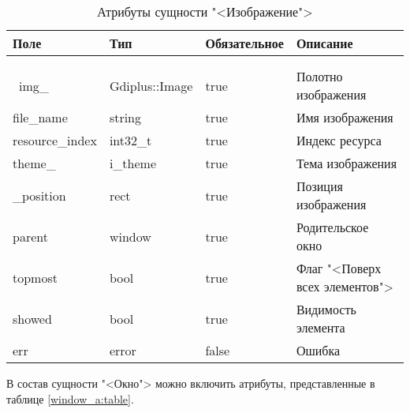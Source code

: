 \begin{xltabular}{\textwidth}{|l|l|p{1.7cm}|X|}
	\caption{Атрибуты сущности "<Изображение">\label{img_a:table}}\\ \hline
	\centrow Поле & \centrow Тип & \centrow Обяза\-тельное & \centrow Описание \\ \hline
	 &  &  &  \\ \hline
	\endfirsthead
	 &  &  &  \\ \hline
	\finishhead
	\ img{\_} & Gdiplus::Image & true & Полотно изображения \\ \hline
	file{\_}name & string & true & Имя изображения \\ \hline
	resource{\_}index & int32{\_}t & true & Индекс ресурса \\ \hline
	theme{\_}  & i{\_}theme & true & Тема изображения \\ \hline
	{\_}position & rect & true & Позиция изображения \\ \hline
	parent & window & true & Родительское окно \\ \hline
	topmost & bool & true & Флаг "<Поверх всех элементов"> \\ \hline 
	showed & bool & true & Видимость элемента \\ \hline  
	err & error & false & Ошибка
\end{xltabular}

В состав сущности "<Окно"> можно включить атрибуты, представленные в таблице \ref{window_a:table}.

